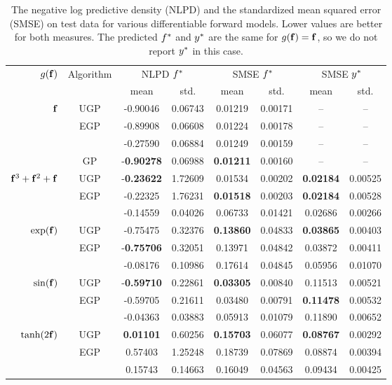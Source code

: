 \documentclass{article} %
\begin{document}
\begin{table}[tb]
    \centering
    \caption[]{The negative log predictive density (NLPD) and the standardized
        mean squared error (SMSE) on test data for various differentiable
        forward models. Lower values are better for both measures.  The predicted
        $f^{*}$ and $y^{*}$ are the same for $g\!\left({{\mathbf{f}}}\right) =
        \mathbf{f}$, so we do not report $y^{*}$ in this case.}

    \footnotesize
    \begin{tabular}{r|c| c c c c c c}
        \multirow{2}{*}{$g\!\left({{\mathbf{f}}}\right)$} & \multirow{2}{*}{Algorithm} & 
            \multicolumn{2}{c}{NLPD $f^{*}$} &
            \multicolumn{2}{c}{SMSE $f^{*}$} &
            \multicolumn{2}{c}{SMSE $y^{*}$} \\
        & & mean & std. & mean & std. & mean & std.\\
        \toprule
        $\mathbf{f}$ 
& UGP & -0.90046 & 0.06743 & 0.01219 & 0.00171 & -- & -- \\
& EGP & -0.89908 & 0.06608 & 0.01224 & 0.00178 & -- & -- \\
& \cite{Opper2009} & -0.27590 & 0.06884 & 0.01249 & 0.00159 & -- & -- \\
& GP & -\textbf{0.90278} & 0.06988 & \textbf{0.01211} & 0.00160 & -- & -- \\
        \midrule
        $\mathbf{f}^3 + \mathbf{f}^2 + \mathbf{f}$ 
& UGP & -\textbf{0.23622} & 1.72609 & 0.01534 & 0.00202 &
\textbf{0.02184} & 0.00525 \\
& EGP & -0.22325 & 1.76231 & \textbf{0.01518} & 0.00203 & \textbf{0.02184} & 0.00528 \\
& \cite{Opper2009} & -0.14559 & 0.04026 & 0.06733 & 0.01421 & 0.02686 & 0.00266 \\
        \midrule
        $\exp\!\left({\mathbf{f}}\right)$ 
& UGP & -0.75475 & 0.32376 & \textbf{0.13860} & 0.04833 & \textbf{0.03865} & 0.00403 \\
& EGP & -\textbf{0.75706} & 0.32051 & 0.13971 & 0.04842 & 0.03872 & 0.00411 \\
& \cite{Opper2009} & -0.08176 & 0.10986 & 0.17614 & 0.04845 & 0.05956 & 0.01070 \\
        \midrule
        $\sin\!\left({\mathbf{f}}\right)$ 
& UGP & -\textbf{0.59710} & 0.22861 & \textbf{0.03305} & 0.00840 & 0.11513 & 0.00521 \\
& EGP & -0.59705 & 0.21611 & 0.03480 & 0.00791 & \textbf{0.11478} & 0.00532 \\
& \cite{Opper2009} & -0.04363 & 0.03883 & 0.05913 & 0.01079 & 0.11890 & 0.00652 \\
        \midrule
        $\tanh\!\left({2\mathbf{f}}\right)$
& UGP & \textbf{0.01101} & 0.60256 & \textbf{0.15703} & 0.06077 &
\textbf{0.08767} & 0.00292 \\
& EGP & 0.57403 & 1.25248 & 0.18739 & 0.07869 & 0.08874 & 0.00394 \\
& \cite{Opper2009} & 0.15743 & 0.14663 & 0.16049 & 0.04563 & 0.09434 & 0.00425 \\
        \bottomrule
    \end{tabular}
    \label{tab:toy}
\end{table}
\end{document}
